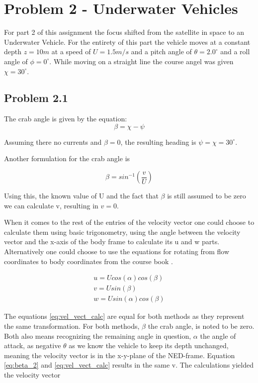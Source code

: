 \section*{Problem 2 - Underwater Vehicles}
For part 2 of this assignment the focus shifted from the satellite in space to an Underwater Vehicle. For the entirety of this part the vehicle moves at a constant depth $z=10m$ at a speed of $U=1.5m/s$ and a pitch angle of $\theta = 2.0^\circ$ and a roll angle of $\phi = 0^\circ$. While moving on a straight line the course angel was given $\chi = 30^\circ$.
\subsection*{Problem 2.1}
The crab angle is given by the equation:
\begin{equation}
    \beta = \chi - \psi
\end{equation}

Assuming there no currents and $\beta = 0$, the resulting heading is $\psi = \chi = 30^\circ$.

Another formulation for the crab angle is

\begin{equation}
    \beta = sin^{-1}(\frac{v}{U})
    \label{eq:beta_2}
\end{equation}

Using this, the known value of U and the fact that $\beta$ is still assumed to be zero we can calculate v, resulting in $v=0$.

When it comes to the rest of the entries of the velocity vector one could choose to calculate them using basic trigonometry, using the angle between the velocity vector and the x-axis of the body frame to calculate its u and w parts. Alternatively one could choose to use the equations for rotating from flow coordinates to body coordinates from the course book \cite{Fossen2011}. 

\begin{subequations}
\label{eq:vel_vect_calc}
    \begin{align}
        u = U cos(\alpha)cos(\beta) \\
        v = U sin(\beta) \\
        w = U sin(\alpha)cos(\beta)
    \end{align}
\end{subequations}

The equations \eqref{eq:vel_vect_calc} are equal for both methods as they represent the same transformation. For both methods, $\beta$ the crab angle, is noted to be zero. Both also means recognizing the remaining angle in question, $\alpha$ the angle of attack, as negative $\theta$ as we know the vehicle to keep its depth unchanged, meaning the velocity vector is in the x-y-plane of the NED-frame. Equation \eqref{eq:beta_2} and \eqref{eq:vel_vect_calc} results in the same v. The calculations yielded the velocity vector

